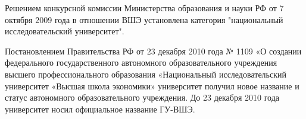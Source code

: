 \documentclass[a4paper,12pt]{article}
\begin{document}
Решением конкурсной комиссии Министерства образования и науки РФ от 7 октября 2009 года в отношении ВШЭ установлена категория "национальный исследовательский университет". 

Постановлением Правительства РФ от 23 декабря 2010 года № 1109 «О создании федерального государственного автономного образовательного учреждения высшего профессионального образования «Национальный исследовательский университет «Высшая школа экономики» университет получил новое название и статус автономного образовательного учреждения. До 23 декабря 2010 года университет носил официальное название ГУ-ВШЭ.

\listoffigures

\listoftables
\end{document}
